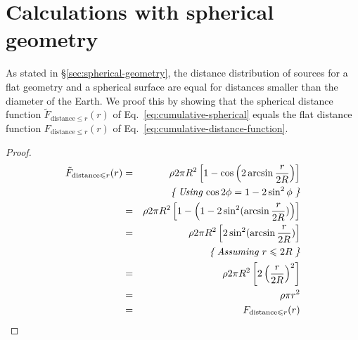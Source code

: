 \documentclass[useAMS,usenatbib]{mn2e}
\begin{document}
\section{Calculations with spherical geometry} \label{sec:proof-spherical-case}
As stated in \S\ref{sec:spherical-geometry}, the distance distribution of sources for a flat geometry and a spherical surface are equal for distances smaller than the diameter of the Earth. We proof this by showing that the spherical distance function $\tilde{F}_{\textrm{distance} \le r}(r)$ of Eq.~\ref{eq:cumulative-spherical} equals the flat distance function $F_{\textrm{distance} \le r}(r)$ of Eq.~\ref{eq:cumulative-distance-function}.
\begin{proof}
\begin{eqnarray} \notag
\tilde{F}_{\textrm{distance} \le r}(r) & = & \rho 2 \pi R^2 \left[1  - \cos\left(2 \arcsin \frac{r}{2R}\right)\right] \\\notag
& & \textit{\{\hspace{1mm}Using $\cos 2\phi = 1 - 2\sin^2 \phi$\hspace{1mm}\}} \\\notag
& = & \rho 2 \pi R^2 \left[1 - \left(1 - 2 \sin^2(\arcsin \frac{r}{2R})\right)\right] \\\notag
& = & \rho 2 \pi R^2 \left[2 \sin^2(\arcsin \frac{r}{2R})\right] \\\notag
& & \textit{\{\hspace{1mm}Assuming $r \le 2R$\hspace{1mm}\}} \\\notag
& = & \rho 2 \pi R^2 \left[2 \left(\frac{r}{2R}\right)^2\right] \\\notag
& = & \rho \pi r^2 \\
& = & F_{\textrm{distance} \le r}(r)
\end{eqnarray}
\end{proof}




\end{document}
